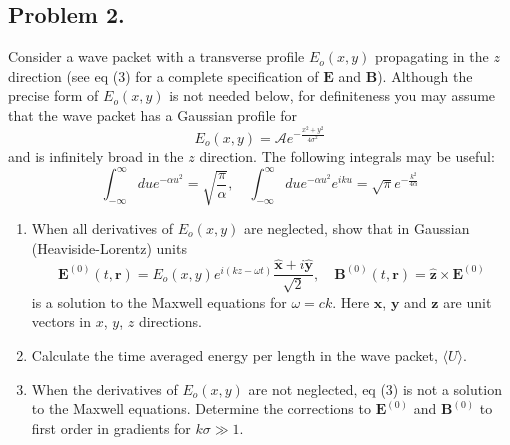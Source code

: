 \subsection*{Problem 2.}

\begin{exercise}
\label{physics:2025:2}
Consider a wave packet with a transverse profile $E_o(x, y)$ propagating in the $z$ direction (see eq (3) for a complete specification of $\mathbf{E}$ and $\mathbf{B}$). Although the precise form of $E_o(x, y)$ is not needed below, for definiteness you may assume that the wave packet has a Gaussian profile for
\begin{equation}
    E_o(x, y) = \mathcal{A} e^{-\frac{x^2 + y^2}{4 \sigma^2}} \tag{1}
\end{equation}
and is infinitely broad in the $z$ direction. The following integrals may be useful:
\begin{equation*}
    \int_{-\infty}^\infty du e^{-\alpha u^2} = \sqrt{\frac{\pi}{\alpha}}, \quad \int_{-\infty}^\infty du e^{-\alpha u^2} e^{iku} = \sqrt{\pi} e^{-\frac{k^2}{4 \alpha}}
\end{equation*}

\begin{enumerate}
    \item When all derivatives of $E_o(x, y)$ are neglected, show that in Gaussian (Heaviside-Lorentz) units
    \begin{equation}
        \mathbf{E}^{(0)}(t, \mathbf{r}) = E_o(x, y) e^{i(kz - \omega t)} \frac{\hat{\mathbf{x}} + i \hat{\mathbf{y}}}{\sqrt{2}}, \quad \mathbf{B}^{(0)}(t, \mathbf{r}) = \hat{\mathbf{z}} \times \mathbf{E}^{(0)} \tag{3}
    \end{equation}
    is a solution to the Maxwell equations for $\omega = ck$. Here $\mathbf{x}$, $\mathbf{y}$ and $\mathbf{z}$ are unit vectors in $x$, $y$, $z$ directions.
    \item Calculate the time averaged energy per length in the wave packet, $\langle U \rangle$.
    \item When the derivatives of $E_o(x, y)$ are not neglected, eq (3) is not a solution to the Maxwell equations. Determine the corrections to $\mathbf{E}^{(0)}$ and $\mathbf{B}^{(0)}$ to first order in gradients for $k \sigma \gg 1$.


\end{enumerate}
\end{exercise}
